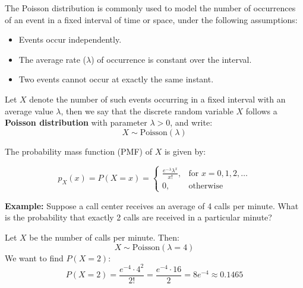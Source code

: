 \documentclass[twoside]{book}
\begin{document}
The {Poisson distribution} is commonly used to model the number of occurrences of an event in a fixed interval of time or space, under the following assumptions:
\begin{itemize}
    \item Events occur independently.
    \item The average rate ($\lambda$) of occurrence is constant over the interval.
    \item Two events cannot occur at exactly the same instant.
\end{itemize}

Let $X$ denote the number of such events occurring in a fixed interval with an average value $\lambda$, then we say that the discrete random variable $X$ follows a \textbf{Poisson distribution} with parameter $\lambda > 0$, and write:
\[
X \sim \text{Poisson}(\lambda)
\]

The probability mass function (PMF) of $X$ is given by:
\begin{textbox}
\[
p_X(x) = P(X = x) =
\begin{cases}
\displaystyle \frac{e^{-\lambda} \lambda^x}{x!}, & \text{for } x = 0, 1, 2, \ldots \\
0, & \text{otherwise}
\end{cases}
\]
\end{textbox}

\textbf{Example:} Suppose a call center receives an average of 4 calls per minute. What is the probability that exactly 2 calls are received in a particular minute?

Let $X$ be the number of calls per minute. Then:
\[
X \sim \text{Poisson}(\lambda = 4)
\]
We want to find $P(X = 2)$:
\[
P(X = 2) = \frac{e^{-4} \cdot 4^2}{2!} = \frac{e^{-4} \cdot 16}{2} = 8e^{-4} \approx 0.1465
\]

\begin{center}
\end{center}
\end{document}

